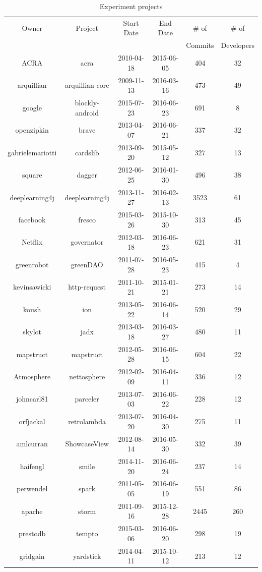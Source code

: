 \begin{table}[!hbp]
\begin{center}
    \begin{tabular}{|c|c|c|c|c|c|}
        \hline
        Owner & Project & Start Date & End Date & \# of & \# of \\
         & & & & Commits & Developers \\
        \hline
        ACRA & acra & 2010-04-18 & 2015-06-05 & 404 & 32 \\
        arquillian & arquillian-core & 2009-11-13 & 2016-03-16 & 473 & 49 \\
        google & blockly-android & 2015-07-23 & 2016-06-23 & 691 & 8 \\
        openzipkin & brave & 2013-04-07 & 2016-06-21 & 337 & 32 \\
        gabrielemariotti & cardslib & 2013-09-20 & 2015-05-12 & 327 & 13 \\
        square & dagger & 2012-06-25 & 2016-01-30 & 496 & 38 \\
        deeplearning4j & deeplearning4j & 2013-11-27 & 2016-02-13 & 3523 & 61 \\
        facebook & fresco & 2015-03-26 & 2015-10-30 & 313 & 45 \\
        Netflix & governator & 2012-03-18 & 2016-06-23 & 621 & 31 \\
        greenrobot & greenDAO & 2011-07-28 & 2016-05-23 & 415 & 4 \\
        kevinsawicki & http-request & 2011-10-21 & 2015-01-21 & 273 & 14 \\
        koush & ion & 2013-05-22 & 2016-06-14 & 520 & 29 \\
        skylot & jadx & 2013-03-18 & 2016-03-27 & 480 & 11 \\
        mapstruct & mapstruct & 2012-05-28 & 2016-06-15 & 604 & 22 \\
        Atmosphere & nettosphere & 2012-02-09 & 2016-04-11 & 336 & 12 \\
        johncarl81 & parceler & 2013-07-03 & 2016-06-22 & 228 & 12 \\
        orfjackal & retrolambda & 2013-07-20 & 2016-04-30 & 275 & 11 \\
        amlcurran & ShowcaseView & 2012-08-14 & 2016-05-30 & 332 & 39 \\
        haifengl & smile & 2014-11-20 & 2016-06-24 & 237 & 14 \\
        perwendel & spark & 2011-05-05 & 2016-06-19 & 551 & 86 \\
        apache & storm & 2011-09-16 & 2015-12-28 & 2445 & 260 \\
        prestodb & tempto & 2015-03-06 & 2016-06-20 & 298 & 19 \\
        gridgain & yardstick & 2014-04-11 & 2015-10-12 & 213 & 12 \\
        \hline
    \end{tabular}
\end{center}
\caption{Experiment projects}
\label{tab:project_summary}
\end{table}

